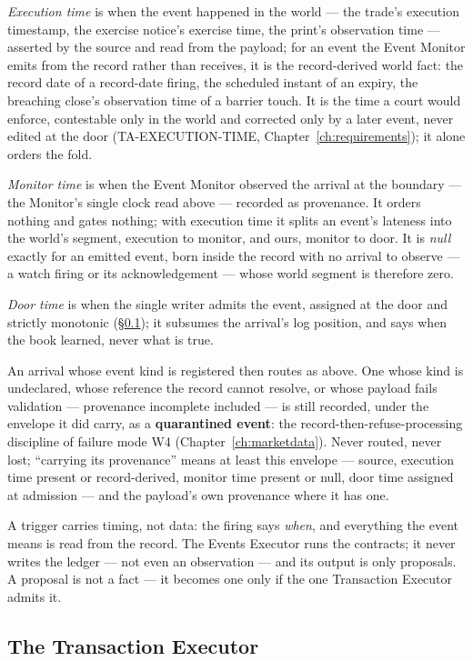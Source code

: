 \documentclass[11pt,a4paper]{article}
\begin{document}
\emph{Execution time} is when the event happened in the world --- the trade's execution
timestamp, the exercise notice's exercise time, the print's observation time --- asserted by
the source and read from the payload; for an event the Event Monitor emits from the record
rather than receives, it is the record-derived world fact: the record date of a record-date
firing, the scheduled instant of an expiry, the breaching close's observation time of a
barrier touch. It is the time a court would enforce, contestable only in the world and
corrected only by a later event, never edited at the door (TA-EXECUTION-TIME,
Chapter~\ref{ch:requirements}); it alone orders the fold.

\emph{Monitor time} is when the Event Monitor observed the arrival at the boundary --- the
Monitor's single clock read above --- recorded as provenance. It orders nothing and gates
nothing; with execution time it splits an event's lateness into the world's segment,
execution to monitor, and ours, monitor to door. It is \emph{null} exactly for an emitted
event, born inside the record with no arrival to observe --- a watch firing or its
acknowledgement --- whose world segment is therefore zero.

\emph{Door time} is when the single writer admits the event, assigned at the door and
strictly monotonic (\S\ref{sec:txexec}); it subsumes the arrival's log position, and says
when the book learned, never what is true.

An arrival whose event kind is registered then routes as above. One whose kind is undeclared,
whose reference the record cannot resolve, or whose payload fails validation --- provenance
incomplete included --- is still recorded, under the envelope it did carry, as a
\textbf{quarantined event}: the record-then-refuse-processing discipline of failure mode W4
(Chapter~\ref{ch:marketdata}). Never routed, never lost; ``carrying its provenance'' means at
least this envelope --- source, execution time present or record-derived, monitor time
present or null, door time assigned at admission --- and the payload's own provenance where
it has one.

A trigger carries timing, not data: the firing says \emph{when}, and everything
the event means is read from the record. The Events Executor runs the
contracts; it never writes the ledger --- not even an observation --- and its
output is only proposals. A proposal is not a fact --- it becomes one only if the
one Transaction Executor admits it.

\subsection{The Transaction Executor}\label{sec:txexec}
\end{document}
